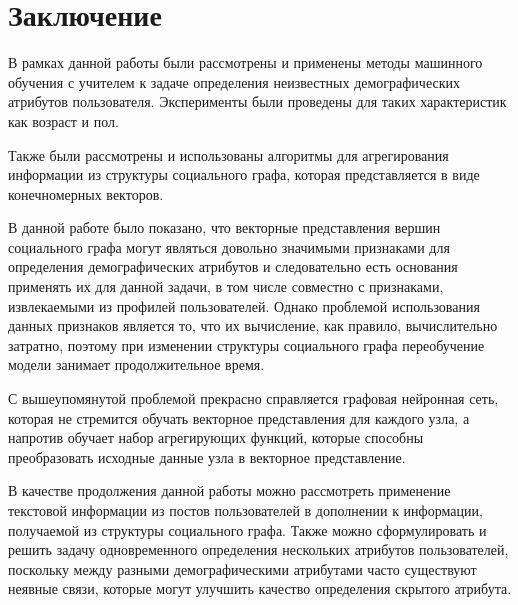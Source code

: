 \section{Заключение}
В рамках данной работы были рассмотрены и применены методы машинного обучения с учителем к задаче определения неизвестных демографических атрибутов пользователя. Эксперименты были проведены для таких характеристик как возраст и пол. 

Также были рассмотрены и использованы алгоритмы для агрегирования информации из структуры социального графа, которая представляется в виде конечномерных векторов.  

В данной работе было показано, что векторные представления вершин социального графа могут являться довольно значимыми признаками для определения демографических атрибутов и следовательно есть основания применять их для данной задачи, в том числе совместно с
признаками, извлекаемыми из профилей пользователей.  Однако проблемой использования данных признаков является то, что их вычисление, как правило, вычислительно затратно, поэтому при изменении структуры социального графа переобучение модели занимает продолжительное время. 

С вышеупомянутой проблемой прекрасно справляется графовая нейронная сеть, которая не стремится обучать векторное представления для каждого узла, а напротив обучает набор агрегирующих функций, которые способны преобразовать исходные данные узла в векторное представление.

В качестве продолжения данной работы можно рассмотреть применение текстовой информации из постов пользователей в дополнении к информации, получаемой из структуры социального графа. Также можно
сформулировать и решить задачу одновременного определения нескольких атрибутов пользователей, поскольку между разными демографическими атрибутами часто существуют неявные связи, которые могут улучшить качество определения скрытого атрибута.


\clearpage